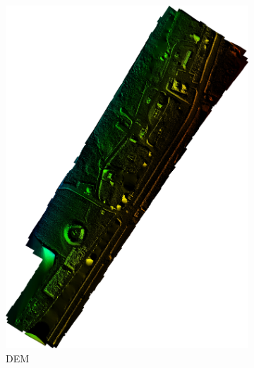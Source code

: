 \documentclass{article}
\begin{document}
\begin{figure} [h]
\begin{subfigure} [b]{0.33\textwidth}
         \includegraphics[scale=0.055]{ROB-15-0035_fig24b.jpg}
         \caption{DEM}
         \label{fig:bbb}
    \end{subfigure}
    \begin{subfigure} [b]{0.33\textwidth}
         \centering

\end{subfigure}
\end{figure}
\end{document}
